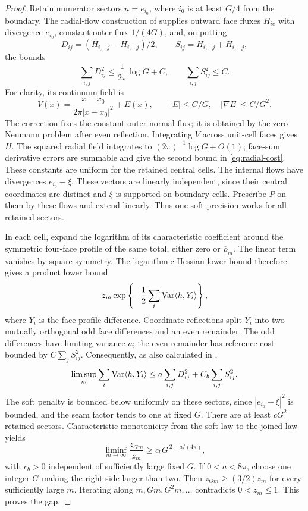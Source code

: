 \begin{proof}
Retain numerator sectors \(n=e_{i_0}\), where \(i_0\) is at
least \(G/4\) from the boundary. The radial-flow construction
of  supplies outward face fluxes \(H_{ie}\)
with divergence \(e_{i_0}\), constant outer flux \(1/(4G)\),
and, on putting
\[
 D_{ij}=(H_{i,+j}-H_{i,-j})/2,\qquad
 S_{ij}=H_{i,+j}+H_{i,-j},
\]
the bounds
\begin{equation}
 \sum_{i,j}D_{ij}^2\le\frac1{2\pi}\log G+C,\qquad
 \sum_{i,j}S_{ij}^2\le C.
 \label{eq:radial-cost}
\end{equation}
For clarity, its continuum field is
\[
 V(x)=\frac{x-x_0}{2\pi|x-x_0|^2}+E(x),\qquad
 |E|\le C/G,\quad|\nabla E|\le C/G^2.
\]
The correction fixes the constant outer normal flux; it is
obtained by the zero-Neumann problem after even reflection.
Integrating \(V\) across unit-cell faces gives \(H\).
The squared radial field integrates to
\((2\pi)^{-1}\log G+O(1)\); face-sum derivative errors are
summable and give the second bound in \eqref{eq:radial-cost}.
These constants are uniform for the retained central cells.
The internal flows have divergences \(e_{i_0}-\xi\).
These vectors are linearly independent, since their central
coordinates are distinct and \(\xi\) is supported on boundary
cells. Prescribe \(P\) on them by these flows and extend
linearly. Thus one soft precision works for all retained
sectors.

In each cell, expand the logarithm of its characteristic
coefficient around the symmetric four-face profile of the
same total, either zero or \(\overline\rho_m\).
The linear term vanishes by square symmetry. The logarithmic
Hessian lower bound therefore gives a product lower bound
\[
 z_m\exp\left\{-\frac12\sum_i\operatorname{Var}\langle h,Y_i\rangle\right\},
\]
where \(Y_i\) is the face-profile difference.
Coordinate reflections split \(Y_i\) into two mutually
orthogonal odd face differences and an even remainder.
The odd differences have limiting variance \(a\); the even
remainder has reference cost bounded by
\(C\sum_jS_{ij}^2\). Consequently, as also calculated in
,
\[
 \limsup_m\sum_i\operatorname{Var}\langle h,Y_i\rangle
       \le a\sum_{i,j}D_{ij}^2+C_b\sum_{i,j}S_{ij}^2.
\]
The soft penalty is bounded below uniformly on these
sectors, since \(|e_{i_0}-\xi|^2\) is bounded, and the seam
factor tends to one at fixed \(G\).
There are at least \(cG^2\) retained sectors. Characteristic
monotonicity from the soft law to the joined law yields
\begin{equation}
 \liminf_{m\to\infty}\frac{z_{Gm}}{z_m}
       \ge c_bG^{\,2-a/(4\pi)},
 \label{eq:face-ratio}
\end{equation}
with \(c_b>0\) independent of sufficiently large fixed \(G\).
If \(0<a<8\pi\), choose one integer \(G\) making the right side
larger than two. Then \(z_{Gm}\ge(3/2)z_m\) for every
sufficiently large \(m\). Iterating along \(m,Gm,G^2m,\ldots\)
contradicts \(0<z_m\le1\). This proves the gap.
\end{proof}

